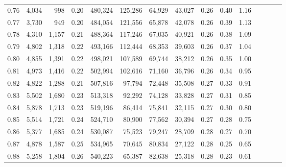 \begin{tabular}{rrrcrrrrrrrrrrr}
0.76 &   4,034 &     998 &                                       0.20 &  480,324 &  125,286 &   64,929 &   43,027 &  0.26 &  0.40 &                         1.16 \\
0.77 &   3,730 &     949 &                                       0.20 &  484,054 &  121,556 &   65,878 &   42,078 &  0.26 &  0.39 &                         1.13 \\
0.78 &   4,310 &   1,157 &                                       0.21 &  488,364 &  117,246 &   67,035 &   40,921 &  0.26 &  0.38 &                         1.09 \\
0.79 &   4,802 &   1,318 &                                       0.22 &  493,166 &  112,444 &   68,353 &   39,603 &  0.26 &  0.37 &                         1.04 \\
0.80 &   4,855 &   1,391 &                                       0.22 &  498,021 &  107,589 &   69,744 &   38,212 &  0.26 &  0.35 &                         1.00 \\
0.81 &   4,973 &   1,416 &                                       0.22 &  502,994 &  102,616 &   71,160 &   36,796 &  0.26 &  0.34 &                         0.95 \\
0.82 &   4,822 &   1,288 &                                       0.21 &  507,816 &   97,794 &   72,448 &   35,508 &  0.27 &  0.33 &                         0.91 \\
0.83 &   5,502 &   1,680 &                                       0.23 &  513,318 &   92,292 &   74,128 &   33,828 &  0.27 &  0.31 &                         0.85 \\
0.84 &   5,878 &   1,713 &                                       0.23 &  519,196 &   86,414 &   75,841 &   32,115 &  0.27 &  0.30 &                         0.80 \\
0.85 &   5,514 &   1,721 &                                       0.24 &  524,710 &   80,900 &   77,562 &   30,394 &  0.27 &  0.28 &                         0.75 \\
0.86 &   5,377 &   1,685 &                                       0.24 &  530,087 &   75,523 &   79,247 &   28,709 &  0.28 &  0.27 &                         0.70 \\
0.87 &   4,878 &   1,587 &                                       0.25 &  534,965 &   70,645 &   80,834 &   27,122 &  0.28 &  0.25 &                         0.65 \\
0.88 &   5,258 &   1,804 &                                       0.26 &  540,223 &   65,387 &   82,638 &   25,318 &  0.28 &  0.23 &                         0.61 \\

\end{tabular}
